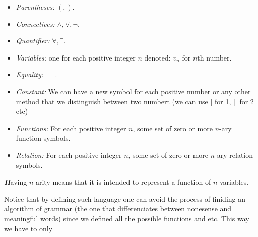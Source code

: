 \documentclass[10pt,a4paper]{article}
\newenvironment{callout}
	{\begin{calloutbox}\color{charcoal}\textbf\textit}
	{\end{calloutbox}}
\begin{document}
                    \begin{itemize}
                        \item \textit{Parentheses:} $(,)$.
                        \item \textit{Connectives:} $\land, \lor, \neg$.
                        \item \textit{Quantifier:} $\forall, \exists$.
                        \item \textit{Variables:} one for each positive integer $n$ denoted: $v_n$ for $n$th number.
                        \item \textit{Equality:} $=$.
                        \item \textit{Constant:} We can have a new symbol for each positive number or any other method that we distinguish between two numbert (we can use | for 1, || for 2 etc)
                        \item \textit{Functions:} For each positive integer $n$, some set of zero or more $n$-ary function symbols.
                        \item \textit{Relation:} For each positive integer $n$, some set of zero or more $n$-ary relation symbols.
                    \end{itemize}
                    \begin{callout}
                        Having $n$ arity means that it is intended to represent a function of $n$ variables.
                    \end{callout}
                    Notice that by defining such language one can avoid the process of finiding an algorithm of grammar (the one that differenciates between nonesense and meaningful words) since we defined all the possible functions and etc. This way we have to only
\end{document}
